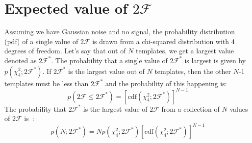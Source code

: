 \documentclass{ttuthes2007}
\begin{document}
\section{Expected value of $2\mathcal{F}$}
Assuming we have Gaussian noise and no signal, the probability distribution
(pdf) of a single value of $2\mathcal{F}$ is drawn from a chi-squared
distribution with 4 degrees of freedom.  Let's say that out of $N$ templates, we
get a largest value denoted as $2\mathcal{F}^*$. The probability that a single
value of $2\mathcal{F}^*$ is largest is given by $p(\chi^2_4;2\mathcal{F}^*)$.
If $2\mathcal{F}^*$ is the largest value out of $N$ templates, then the other
$N$-1 templates must be less than $2\mathcal{F}^*$ and the probability of this
happening is:
\begin{equation}
p(2\mathcal{F}\leq2\mathcal{F}^*)= [\mathrm{cdf}(\chi^2_4;2\mathcal{F}^*)]^{N-1}
\end{equation} 
The probability that $2\mathcal{F}^*$ is the largest value of $2\mathcal{F}$
from a collection of $N$ values of $2\mathcal{F}$ is~\cite{Abadie_2010, Wette:2009uea}:
\begin{equation}                                                                
p(N;2\mathcal{F}^*)=
Np(\chi^2_4;2\mathcal{F}^*)[\mathrm{cdf}(\chi^2_4;2\mathcal{F}^*)]^{N-1} 
\end{equation}
\end{document}

